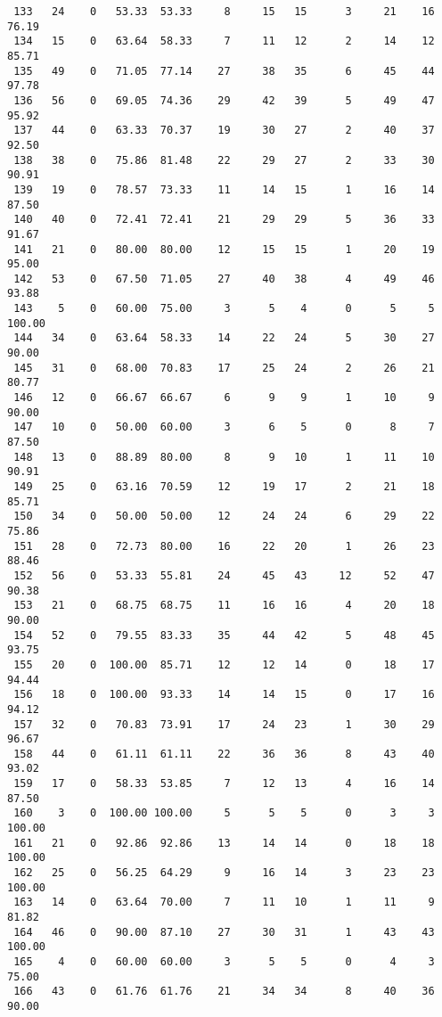 \begin{verbatim}
 133   24    0   53.33  53.33     8     15   15      3     21    16    76.19
 134   15    0   63.64  58.33     7     11   12      2     14    12    85.71
 135   49    0   71.05  77.14    27     38   35      6     45    44    97.78
 136   56    0   69.05  74.36    29     42   39      5     49    47    95.92
 137   44    0   63.33  70.37    19     30   27      2     40    37    92.50
 138   38    0   75.86  81.48    22     29   27      2     33    30    90.91
 139   19    0   78.57  73.33    11     14   15      1     16    14    87.50
 140   40    0   72.41  72.41    21     29   29      5     36    33    91.67
 141   21    0   80.00  80.00    12     15   15      1     20    19    95.00
 142   53    0   67.50  71.05    27     40   38      4     49    46    93.88
 143    5    0   60.00  75.00     3      5    4      0      5     5   100.00
 144   34    0   63.64  58.33    14     22   24      5     30    27    90.00
 145   31    0   68.00  70.83    17     25   24      2     26    21    80.77
 146   12    0   66.67  66.67     6      9    9      1     10     9    90.00
 147   10    0   50.00  60.00     3      6    5      0      8     7    87.50
 148   13    0   88.89  80.00     8      9   10      1     11    10    90.91
 149   25    0   63.16  70.59    12     19   17      2     21    18    85.71
 150   34    0   50.00  50.00    12     24   24      6     29    22    75.86
 151   28    0   72.73  80.00    16     22   20      1     26    23    88.46
 152   56    0   53.33  55.81    24     45   43     12     52    47    90.38
 153   21    0   68.75  68.75    11     16   16      4     20    18    90.00
 154   52    0   79.55  83.33    35     44   42      5     48    45    93.75
 155   20    0  100.00  85.71    12     12   14      0     18    17    94.44
 156   18    0  100.00  93.33    14     14   15      0     17    16    94.12
 157   32    0   70.83  73.91    17     24   23      1     30    29    96.67
 158   44    0   61.11  61.11    22     36   36      8     43    40    93.02
 159   17    0   58.33  53.85     7     12   13      4     16    14    87.50
 160    3    0  100.00 100.00     5      5    5      0      3     3   100.00
 161   21    0   92.86  92.86    13     14   14      0     18    18   100.00
 162   25    0   56.25  64.29     9     16   14      3     23    23   100.00
 163   14    0   63.64  70.00     7     11   10      1     11     9    81.82
 164   46    0   90.00  87.10    27     30   31      1     43    43   100.00
 165    4    0   60.00  60.00     3      5    5      0      4     3    75.00
 166   43    0   61.76  61.76    21     34   34      8     40    36    90.00

\end{verbatim}

